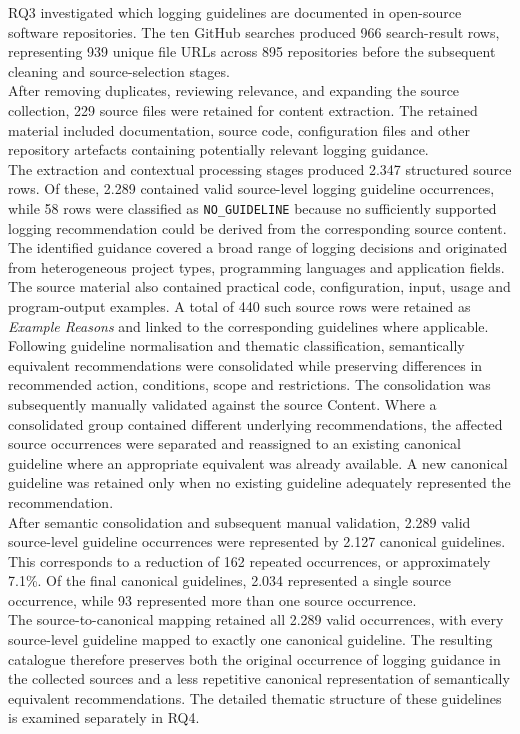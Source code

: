 RQ3 investigated which logging guidelines are documented in open-source software
repositories. The ten GitHub searches produced 966 search-result rows, representing
939 unique file URLs across 895 repositories before the subsequent cleaning and
source-selection stages.
\\
After removing duplicates, reviewing relevance, and expanding the source collection,
229 source files were retained for content extraction. The retained material
included documentation, source code, configuration files and other repository
artefacts containing potentially relevant logging guidance.
\\
The extraction and contextual processing stages produced 2.347 structured source
rows. Of these, 2.289 contained valid source-level logging guideline occurrences,
while 58 rows were classified as \texttt{NO\_GUIDELINE} because no sufficiently
supported logging recommendation could be derived from the corresponding source
content.
\\
The identified guidance covered a broad range of logging decisions and originated
from heterogeneous project types, programming languages and application fields.
The source material also contained practical code, configuration, input, usage and
program-output examples. A total of 440 such source rows were retained as
\textit{Example Reasons} and linked to the corresponding guidelines where
applicable.
\\
Following guideline normalisation and thematic classification, semantically
equivalent recommendations were consolidated while preserving differences in
recommended action, conditions, scope and restrictions. The consolidation was
subsequently manually validated against the source Content. Where a
consolidated group contained different underlying recommendations, the affected
source occurrences were separated and reassigned to an existing canonical guideline
where an appropriate equivalent was already available. A new canonical guideline
was retained only when no existing guideline adequately represented the
recommendation.
\\
After semantic consolidation and subsequent manual validation, 2.289
valid source-level guideline occurrences were represented by 2.127 canonical
guidelines. This corresponds to a reduction of 162 repeated occurrences, or
approximately 7.1\%. Of the final canonical guidelines, 2.034 represented a single
source occurrence, while 93 represented more than one source occurrence.
\\
The source-to-canonical mapping retained all 2.289 valid occurrences, with every
source-level guideline mapped to exactly one canonical guideline. The resulting
catalogue therefore preserves both the original occurrence of logging guidance in
the collected sources and a less repetitive canonical representation of
semantically equivalent recommendations. The detailed thematic structure of these
guidelines is examined separately in RQ4.

